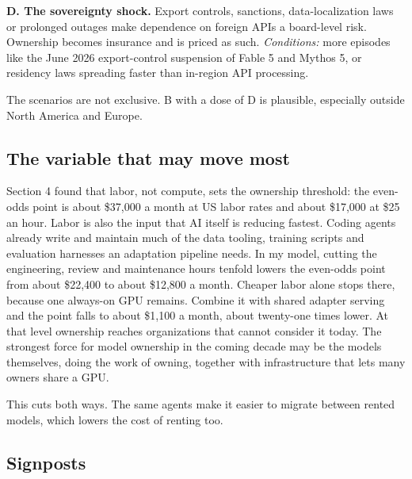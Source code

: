 \textbf{D. The sovereignty shock.} Export controls, sanctions, data-localization laws or prolonged outages make dependence on foreign APIs a board-level risk. Ownership becomes insurance and is priced as such. \emph{Conditions:} more episodes like the June 2026 export-control suspension of Fable 5 and Mythos 5, or residency laws spreading faster than in-region API processing.

The scenarios are not exclusive. B with a dose of D is plausible, especially outside North America and Europe.

\subsection{The variable that may move most}

Section 4 found that labor, not compute, sets the ownership threshold: the even-odds point is about \$37,000 a month at US labor rates and about \$17,000 at \$25 an hour.  Labor is also the input that AI itself is reducing fastest. Coding agents already write and maintain much of the data tooling, training scripts and evaluation harnesses an adaptation pipeline needs.  In my model, cutting the engineering, review and maintenance hours tenfold lowers the even-odds point from about \$22,400 to about \$12,800 a month. Cheaper labor alone stops there, because one always-on GPU remains. Combine it with shared adapter serving and the point falls to about \$1,100 a month, about twenty-one times lower. At that level ownership reaches organizations that cannot consider it today.  The strongest force for model ownership in the coming decade may be the models themselves, doing the work of owning, together with infrastructure that lets many owners share a GPU.

This cuts both ways. The same agents make it easier to migrate between rented models, which lowers the cost of renting too.

\subsection{Signposts}

